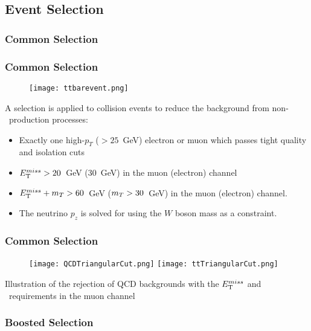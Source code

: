 \subsection{Event Selection}

\subsubsection{Common Selection}

\begin{frame}
    \frametitle{Common Selection}
\begin{figure}
\centering
\texttt{[image: ttbarevent.png]}
\end{figure}
\vfill
A selection is applied to collision events to reduce the background
from non-\ttbar\ production processes:
\begin{itemize}
    \item Exactly one high-$p_T$ ($> 25$~GeV) electron or muon
        which passes tight quality and isolation cuts
    \item $E_{\rm T}^{miss} > 20$~GeV (30~GeV) in the muon (electron) channel
    \item
        $E_{\rm T}^{miss} + m_T > 60$~GeV ($m_T > 30$~GeV) in the muon (electron)
        channel.
    \item The neutrino $p_z$ is solved for using the $W$ boson mass as
        a constraint.
\end{itemize}
\end{frame}

\begin{frame}
    \frametitle{Common Selection}
\begin{figure}
\centering
\texttt{[image: QCDTriangularCut.png]}
\texttt{[image: ttTriangularCut.png]}
\end{figure}
\vfill
\centering
Illustration of the rejection of QCD backgrounds with the $E_{\rm T}^{miss}$ and
\mt\ requirements in the muon channel
\end{frame}

\subsubsection{Boosted Selection}

